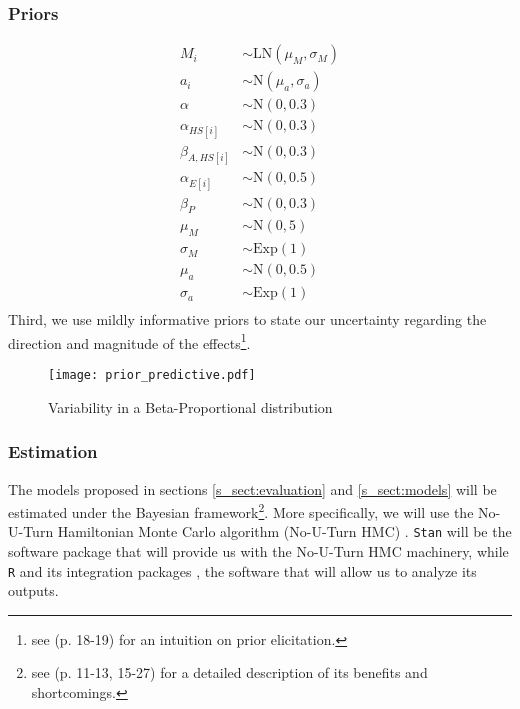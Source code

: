 \subsubsection{Priors}
%
\begin{align}
	M_{i} & \sim \text{LN}( \mu_{M}, \sigma_{M}) \\
	a_{i} & \sim \text{N}(\mu_{a}, \sigma_{a}) \\
	\alpha & \sim \text{N}(0, 0.3) \\
	\alpha_{HS[i]} & \sim \text{N}(0, 0.3) \\
	\beta_{A, HS[i]} & \sim \text{N}(0 , 0.3) \\
	\alpha_{E[i]} & \sim \text{N}(0, 0.5) \\
	\beta_{P} & \sim \text{N}(0, 0.3) \\
	\mu_{M} & \sim \text{N}(0, 5) \\
	\sigma_{M} & \sim \text{Exp}(1) \\
	\mu_{a} & \sim \text{N}(0, 0.5) \\
	\sigma_{a} & \sim \text{Exp}(1)\\
\end{align}
Third, we use mildly informative priors to state our uncertainty regarding the direction and magnitude of the effects\footnote{see \citet{Rivera_2021} (p. 18-19) for an intuition on prior elicitation.}. 
\begin{figure}
	\centering
	\texttt{[image: prior\_predictive.pdf]}
	\caption{Variability in a Beta-Proportional distribution}
	\label{fig:priors}
\end{figure}
%
%
\subsubsection{Estimation}
The models proposed in sections \ref{s_sect:evaluation} and \ref{s_sect:models} will be estimated under the Bayesian framework\footnote{see \citet{Rivera_2021} (p. 11-13, 15-27) for a detailed description of its benefits and shortcomings.}. More specifically, we will use the No-U-Turn Hamiltonian Monte Carlo algorithm (No-U-Turn HMC) \citep{Betancourt_et_al_2013, Duane_et_al_1987, Hoffman_et_al_2014, Neal_2012}. \texttt{Stan} \citep{Stan_2020} will be the software package that will provide us with the No-U-Turn HMC machinery, while \texttt{R} \citep{R_2015} and its integration packages \citep{RStan_2020}, the software that will allow us to analyze its outputs.
%
%
